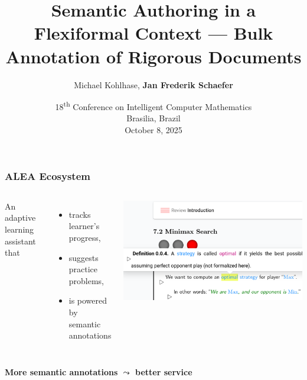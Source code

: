 \documentclass[aspectratio=169]{beamer}
\title{Semantic Authoring in a Flexiformal Context --- Bulk Annotation of Rigorous Documents}
\author{Michael Kohlhase, \bf Jan Frederik Schaefer}
\institute{FAU Erlangen-N\"urnberg}
\date{18\textsuperscript{th} Conference on Intelligent Computer Mathematics\\Brasilia, Brazil\\October 8, 2025}
\begin{document}
\frame\titlepage


\begin{frame}
    \frametitle{AL{\small E}A Ecosystem}
    \begin{columns}
        An adaptive learning assistant that
        \begin{itemize}
            \item tracks learner's progress,
            \item suggests practice problems,
            \item is powered by semantic annotations
        \end{itemize}
        \centering\includegraphics[width=\textwidth]{alea1.png}
    \end{columns}
    \vspace{2em}\par\centering
        {\bf More semantic annotations $\bm\leadsto$ better service}
\end{frame}
\end{document}
